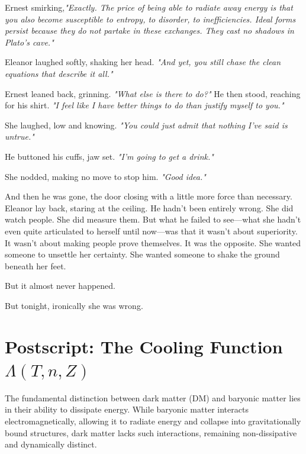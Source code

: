 \bigskip

Ernest smirking,\textit{"Exactly. The price of being able to radiate away energy is that you also become susceptible to entropy, to disorder, to inefficiencies. Ideal forms persist because they do not partake in these exchanges. They cast no shadows in Plato's cave."}

\bigskip

Eleanor laughed softly, shaking her head. \textit{"And yet, you still chase the clean equations that describe it all."}

\bigskip

Ernest leaned back, grinning. \textit{"What else is there to do?"} He then stood, reaching for his shirt.  
\textit{"I feel like I have better things to do than justify myself to you."}

She laughed, low and knowing.  
\textit{"You could just admit that nothing I’ve said is untrue."}

He buttoned his cuffs, jaw set.  
\textit{"I’m going to get a drink."}

She nodded, making no move to stop him.  
\textit{"Good idea."}

\smallskip

And then he was gone, the door closing with a little more force than necessary. Eleanor lay back, staring at the ceiling. He hadn’t been entirely wrong. She did watch people. She did measure them. But what he failed to see—what she hadn’t even quite articulated to herself until now—was that it wasn’t about superiority. It wasn’t about making people prove themselves. It was the opposite. She wanted someone to unsettle her certainty. She wanted someone to shake the ground beneath her feet.

But it almost never happened.

But tonight, ironically she was wrong.



\section*{Postscript: The Cooling Function $\Lambda(T, n, Z)$}

The fundamental distinction between dark matter (DM) and baryonic matter lies in their ability to dissipate energy. While baryonic matter interacts electromagnetically, allowing it to radiate energy and collapse into gravitationally bound structures, dark matter lacks such interactions, remaining non-dissipative and dynamically distinct. 

